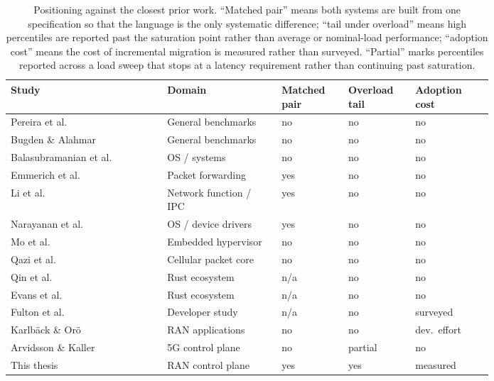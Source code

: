 \documentclass[english,twoside,openright,a4paper,censored,csm,software-track-2020]{HYthesisML}
\begin{document}
\begin{table}
\centering
\small
\caption[Positioning against the closest prior work]{Positioning against the closest prior work. ``Matched pair'' means both systems are
built from one specification so that the language is the only systematic difference; ``tail
under overload'' means high percentiles are reported past the saturation point rather than
average or nominal-load performance; ``adoption cost'' means the cost of incremental migration
is measured rather than surveyed. ``Partial'' marks percentiles reported across a load sweep
that stops at a latency requirement rather than continuing past
saturation.\label{tab:related}}
\renewcommand{\arraystretch}{1.2}
\small
\begin{tabular}{@{}R{0.26\linewidth} R{0.19\linewidth} R{0.11\linewidth} R{0.10\linewidth} R{0.13\linewidth}@{}}
\hline\hline
Study & Domain & Matched pair & Overload tail & Adoption cost \\
\hline
Pereira et al.~\cite{pereira2017energy}      & General benchmarks  & no  & no  & no  \\
Bugden \& Alahmar~\cite{bugden2022rust}      & General benchmarks  & no  & no  & no  \\
Balasubramanian et al.~\cite{balasubramanian2017rust} & OS / systems & no & no & no \\
Emmerich et al.~\cite{emmerich2019drivers}   & Packet forwarding   & yes & no  & no  \\
Li et al.~\cite{li2021ipc}                   & Network function / IPC & yes & no & no \\
Narayanan et al.~\cite{narayanan2020redleaf} & OS / device drivers & yes & no  & no  \\
Mo et al.~\cite{mo2023rustshyper}            & Embedded hypervisor & no  & no  & no  \\
Qazi et al.~\cite{qazi2017pepc}              & Cellular packet core & no & no  & no  \\
Qin et al.~\cite{qin2020rust}                & Rust ecosystem      & n/a & no  & no  \\
Evans et al.~\cite{evans2020rust}            & Rust ecosystem      & n/a & no  & no  \\
Fulton et al.~\cite{fulton2021adopting}      & Developer study     & n/a & no  & surveyed \\
Karlb\"ack \& Or\"o~\cite{karlback2021ran}   & RAN applications    & no  & no  & dev.\ effort \\
Arvidsson \& Kaller~\cite{arvidsson2025async} & 5G control plane   & no  & partial & no \\
\hline
This thesis & RAN control plane & yes & yes & measured \\
\hline
\end{tabular}
\end{table}
\end{document}
